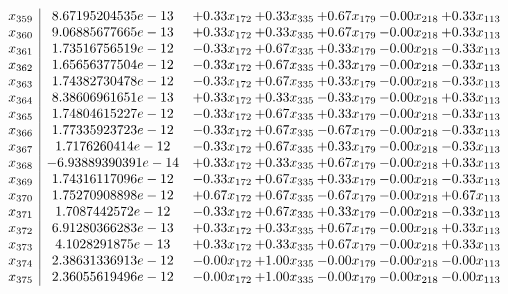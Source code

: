 \documentclass[8pt]{article}
\begin{document}
\[\begin{array}{c| c c@{\hskip 2pt} c@{\hskip 2pt} c@{\hskip 2pt} c@{\hskip 2pt} c@{\hskip 2pt} }
 x_{359}   &  8.67195204535e-13 & +  0.33 x_{172} & +  0.33 x_{335} & +  0.67 x_{179} & -0.00 x_{218} & +  0.33 x_{113}\\
 x_{360}   &  9.06885677665e-13 & +  0.33 x_{172} & +  0.33 x_{335} & +  0.67 x_{179} & -0.00 x_{218} & +  0.33 x_{113}\\
 x_{361}   &  1.73516756519e-12 & -0.33 x_{172} & +  0.67 x_{335} & +  0.33 x_{179} & -0.00 x_{218} & -0.33 x_{113}\\
 x_{362}   &  1.65656377504e-12 & -0.33 x_{172} & +  0.67 x_{335} & +  0.33 x_{179} & -0.00 x_{218} & -0.33 x_{113}\\
 x_{363}   &  1.74382730478e-12 & -0.33 x_{172} & +  0.67 x_{335} & +  0.33 x_{179} & -0.00 x_{218} & -0.33 x_{113}\\
 x_{364}   &  8.38606961651e-13 & +  0.33 x_{172} & +  0.33 x_{335} & -0.33 x_{179} & -0.00 x_{218} & +  0.33 x_{113}\\
 x_{365}   &  1.74804615227e-12 & -0.33 x_{172} & +  0.67 x_{335} & +  0.33 x_{179} & -0.00 x_{218} & -0.33 x_{113}\\
 x_{366}   &  1.77335923723e-12 & -0.33 x_{172} & +  0.67 x_{335} & -0.67 x_{179} & -0.00 x_{218} & -0.33 x_{113}\\
 x_{367}   &  1.7176260414e-12 & -0.33 x_{172} & +  0.67 x_{335} & +  0.33 x_{179} & -0.00 x_{218} & -0.33 x_{113}\\
 x_{368}   &  -6.93889390391e-14 & +  0.33 x_{172} & +  0.33 x_{335} & +  0.67 x_{179} & -0.00 x_{218} & +  0.33 x_{113}\\
 x_{369}   &  1.74316117096e-12 & -0.33 x_{172} & +  0.67 x_{335} & +  0.33 x_{179} & -0.00 x_{218} & -0.33 x_{113}\\
 x_{370}   &  1.75270908898e-12 & +  0.67 x_{172} & +  0.67 x_{335} & -0.67 x_{179} & -0.00 x_{218} & +  0.67 x_{113}\\
 x_{371}   &  1.7087442572e-12 & -0.33 x_{172} & +  0.67 x_{335} & +  0.33 x_{179} & -0.00 x_{218} & -0.33 x_{113}\\
 x_{372}   &  6.91280366283e-13 & +  0.33 x_{172} & +  0.33 x_{335} & +  0.67 x_{179} & -0.00 x_{218} & +  0.33 x_{113}\\
 x_{373}   &  4.1028291875e-13 & +  0.33 x_{172} & +  0.33 x_{335} & +  0.67 x_{179} & -0.00 x_{218} & +  0.33 x_{113}\\
 x_{374}   &  2.38631336913e-12 & -0.00 x_{172} & +  1.00 x_{335} & -0.00 x_{179} & -0.00 x_{218} & -0.00 x_{113}\\
 x_{375}   &  2.36055619496e-12 & -0.00 x_{172} & +  1.00 x_{335} & -0.00 x_{179} & -0.00 x_{218} & -0.00 x_{113}\\

\end{array}\]
\end{document}
